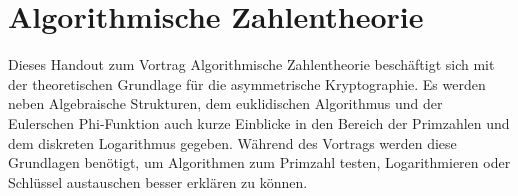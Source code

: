 \chapter*{Algorithmische Zahlentheorie}\label{Algorithmische Zahlentheorie}
	Dieses Handout zum Vortrag Algorithmische Zahlentheorie beschäftigt sich mit der theoretischen Grundlage für die asymmetrische Kryptographie. Es werden neben Algebraische Strukturen, dem euklidischen Algorithmus und der Eulerschen Phi-Funktion auch kurze Einblicke in den Bereich der Primzahlen und dem diskreten Logarithmus gegeben. Während des Vortrags werden diese Grundlagen benötigt, um Algorithmen zum Primzahl testen, Logarithmieren oder Schlüssel austauschen besser erklären zu können.
